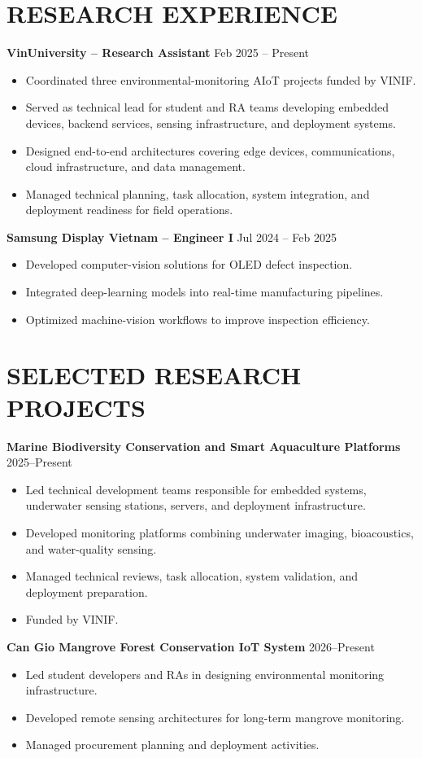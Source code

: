 \documentclass[letterpaper,11pt]{article}
\begin{document}
\section{RESEARCH EXPERIENCE}
\textbf{VinUniversity -- Research Assistant} \hfill Feb 2025 -- Present
\begin{itemize}
\item Coordinated three environmental-monitoring AIoT projects funded by VINIF.
\item Served as technical lead for student and RA teams developing embedded devices, backend services, sensing infrastructure, and deployment systems.
\item Designed end-to-end architectures covering edge devices, communications, cloud infrastructure, and data management.
\item Managed technical planning, task allocation, system integration, and deployment readiness for field operations.
\end{itemize}

\textbf{Samsung Display Vietnam -- Engineer I} \hfill Jul 2024 -- Feb 2025
\begin{itemize}
\item Developed computer-vision solutions for OLED defect inspection.
\item Integrated deep-learning models into real-time manufacturing pipelines.
\item Optimized machine-vision workflows to improve inspection efficiency.
\end{itemize}

\section{SELECTED RESEARCH PROJECTS}
\textbf{Marine Biodiversity Conservation and Smart Aquaculture Platforms} \hfill 2025--Present
\begin{itemize}
\item Led technical development teams responsible for embedded systems, underwater sensing stations, servers, and deployment infrastructure.
\item Developed monitoring platforms combining underwater imaging, bioacoustics, and water-quality sensing.
\item Managed technical reviews, task allocation, system validation, and deployment preparation.
\item Funded by VINIF.
\end{itemize}

\textbf{Can Gio Mangrove Forest Conservation IoT System} \hfill 2026--Present
\begin{itemize}
\item Led student developers and RAs in designing environmental monitoring infrastructure.
\item Developed remote sensing architectures for long-term mangrove monitoring.
\item Managed procurement planning and deployment activities.
\end{itemize}
\end{document}

